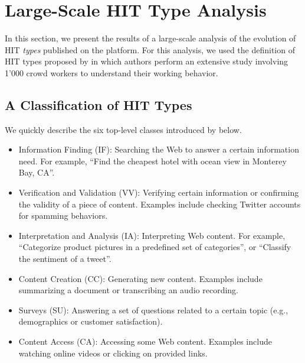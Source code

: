 \section{Large-Scale HIT Type Analysis}\label{sec:type}
In this section, we present the results of a large-scale analysis of the evolution of HIT \emph{types} published on the \amt{} platform.
For this analysis, we used the definition of HIT types proposed by \cite{Gadiraju:2014:TMW:2631775.2631819} in which authors perform an extensive study involving 1'000 crowd workers to understand their working behavior. 

\subsection{A Classification of HIT Types}
We quickly describe the six top-level classes introduced by \cite{Gadiraju:2014:TMW:2631775.2631819} below.

\begin{itemize}[noitemsep,topsep=0pt,parsep=0pt,partopsep=0pt]

	\item Information Finding (IF): Searching the Web to answer a certain information need. For example, ``Find the cheapest hotel with ocean view in Monterey Bay, CA''.
	
	\item Verification and Validation (VV): Verifying certain information or confirming the validity of a piece of content. Examples include checking Twitter accounts for spamming behaviors.

	\item Interpretation and Analysis (IA): Interpreting Web content. For example, ``Categorize product pictures in a predefined set of categories'', or ``Classify the sentiment of a tweet''.
	
	\item Content Creation (CC): Generating new content. Examples include summarizing a document  or transcribing an audio recording.

	\item Surveys (SU): Answering a set of questions related to a certain topic (e.g., demographics or customer satisfaction). 
	
	\item Content Access (CA): Accessing some Web content. Examples include watching online videos or clicking on provided links.

\end{itemize}

